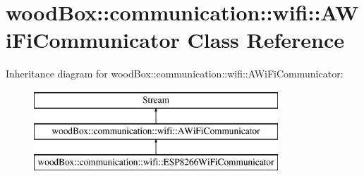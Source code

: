 \hypertarget{classwood_box_1_1communication_1_1wifi_1_1_a_wi_fi_communicator}{}\section{wood\+Box\+:\+:communication\+:\+:wifi\+:\+:A\+Wi\+Fi\+Communicator Class Reference}
\label{classwood_box_1_1communication_1_1wifi_1_1_a_wi_fi_communicator}
Inheritance diagram for wood\+Box\+:\+:communication\+:\+:wifi\+:\+:A\+Wi\+Fi\+Communicator\+:\begin{figure}[H]
\begin{center}
\leavevmode
\includegraphics[height=3.000000cm]{classwood_box_1_1communication_1_1wifi_1_1_a_wi_fi_communicator}
\end{center}
\end{figure}
